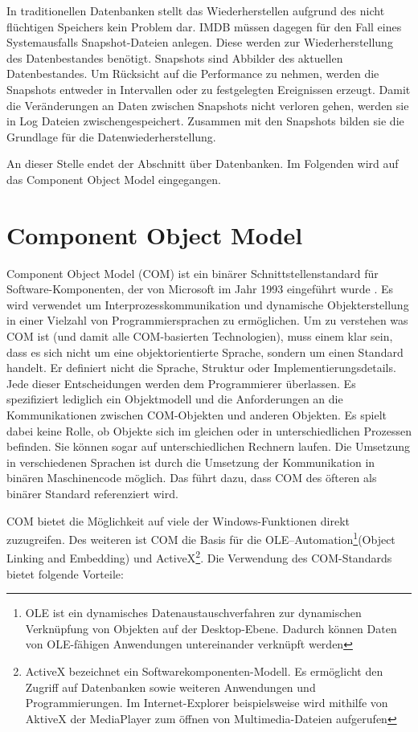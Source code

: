 In traditionellen Datenbanken stellt das Wiederherstellen aufgrund des nicht flüchtigen Speichers kein Problem dar. IMDB müssen dagegen für den Fall eines Systemausfalls Snapshot-Dateien anlegen. Diese werden zur Wiederherstellung des Datenbestandes benötigt. Snapshots sind Abbilder des aktuellen Datenbestandes. Um Rücksicht auf die Performance zu nehmen, werden die Snapshots entweder in Intervallen oder zu festgelegten Ereignissen erzeugt. Damit die Veränderungen an Daten zwischen Snapshots nicht verloren gehen, werden sie in Log Dateien zwischengespeichert. Zusammen mit den Snapshots bilden sie die Grundlage für die Datenwiederherstellung. 

An dieser Stelle endet der Abschnitt über Datenbanken. Im Folgenden wird auf das Component Object Model eingegangen.

\section{Component Object Model}
\label{ch:grundlagen:sec:ComponentObjectModel}

Component Object Model (COM) ist ein binärer Schnittstellenstandard für Software-Komponenten, der von Microsoft im Jahr 1993 eingeführt wurde \cite{SWB-088582566}. Es wird verwendet um Interprozesskommunikation und dynamische Objekterstellung in einer Vielzahl von Programmiersprachen zu ermöglichen. Um zu verstehen was COM ist (und damit alle COM-basierten Technologien), muss einem klar sein, dass es sich nicht um eine objektorientierte Sprache, sondern um einen Standard handelt. Er definiert nicht die Sprache, Struktur oder Implementierungsdetails. Jede dieser Entscheidungen werden dem Programmierer überlassen. Es spezifiziert lediglich ein Objektmodell und die Anforderungen an die Kommunikationen zwischen COM-Objekten und anderen Objekten. Es spielt dabei keine Rolle, ob Objekte sich im gleichen oder in unterschiedlichen Prozessen befinden. Sie können sogar auf unterschiedlichen Rechnern laufen. Die Umsetzung in verschiedenen Sprachen ist durch die Umsetzung der Kommunikation in binären Maschinencode möglich. Das führt dazu, dass COM des öfteren als binärer Standard referenziert wird.

COM bietet die Möglichkeit auf viele der Windows-Funktionen direkt zuzugreifen. Des weiteren ist COM die Basis für die OLE–Automation\footnote{OLE ist ein dynamisches Datenaustauschverfahren zur dynamischen Verknüpfung von Objekten auf der Desktop-Ebene. Dadurch können Daten von OLE-fähigen Anwendungen untereinander verknüpft werden}(Object Linking and Embedding) und ActiveX\footnote{ActiveX bezeichnet ein Softwarekomponenten-Modell. Es ermöglicht den Zugriff auf Datenbanken sowie weiteren Anwendungen und Programmierungen. Im Internet-Explorer beispielsweise wird mithilfe von AktiveX der MediaPlayer zum öffnen von Multimedia-Dateien aufgerufen}. Die Verwendung des COM-Standards bietet folgende Vorteile:

